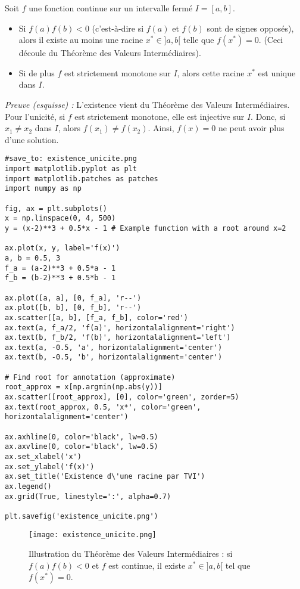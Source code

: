 \begin{proposition}[Cas $f(x)=0$]
Soit $f$ une fonction continue sur un intervalle fermé $I = [a,b]$.
\begin{itemize}
    \item Si $f(a)f(b) < 0$ (c'est-à-dire si $f(a)$ et $f(b)$ sont de signes opposés), alors il existe au moins une racine $x^* \in ]a,b[$ telle que $f(x^*)=0$. (Ceci découle du Théorème des Valeurs Intermédiaires).
    \item Si de plus $f$ est strictement monotone sur $I$, alors cette racine $x^*$ est unique dans $I$.
\end{itemize}
\textit{Preuve (esquisse) :} L'existence vient du Théorème des Valeurs Intermédiaires. Pour l'unicité, si $f$ est strictement monotone, elle est injective sur $I$. Donc, si $x_1 \neq x_2$ dans $I$, alors $f(x_1) \neq f(x_2)$. Ainsi, $f(x)=0$ ne peut avoir plus d'une solution.
\end{proposition}

\begin{verbatim}
#save_to: existence_unicite.png
import matplotlib.pyplot as plt
import matplotlib.patches as patches
import numpy as np

fig, ax = plt.subplots()
x = np.linspace(0, 4, 500)
y = (x-2)**3 + 0.5*x - 1 # Example function with a root around x=2

ax.plot(x, y, label='f(x)')
a, b = 0.5, 3
f_a = (a-2)**3 + 0.5*a - 1
f_b = (b-2)**3 + 0.5*b - 1

ax.plot([a, a], [0, f_a], 'r--')
ax.plot([b, b], [0, f_b], 'r--')
ax.scatter([a, b], [f_a, f_b], color='red')
ax.text(a, f_a/2, 'f(a)', horizontalalignment='right')
ax.text(b, f_b/2, 'f(b)', horizontalalignment='left')
ax.text(a, -0.5, 'a', horizontalalignment='center')
ax.text(b, -0.5, 'b', horizontalalignment='center')

# Find root for annotation (approximate)
root_approx = x[np.argmin(np.abs(y))]
ax.scatter([root_approx], [0], color='green', zorder=5)
ax.text(root_approx, 0.5, 'x*', color='green', horizontalalignment='center')

ax.axhline(0, color='black', lw=0.5)
ax.axvline(0, color='black', lw=0.5)
ax.set_xlabel('x')
ax.set_ylabel('f(x)')
ax.set_title('Existence d\'une racine par TVI')
ax.legend()
ax.grid(True, linestyle=':', alpha=0.7)

plt.savefig('existence_unicite.png')
\end{verbatim}

\begin{figure}[H]
\centering
\texttt{[image: existence\_unicite.png]}
\caption{Illustration du Théorème des Valeurs Intermédiaires : si $f(a)f(b)<0$ et $f$ est continue, il existe $x^* \in ]a,b[$ tel que $f(x^*)=0$.}
\label{fig:existence_unicite}
\end{figure}

